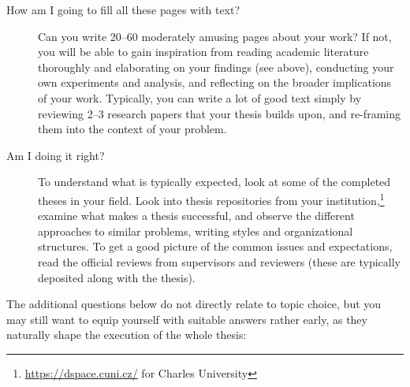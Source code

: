 \begin{description}
\item[How am I going to fill all these pages with text?]
Can you write 20--60 moderately amusing pages about your work? If not, you will be able to gain inspiration from reading academic literature thoroughly and elaborating on your findings (see above), conducting your own experiments and analysis, and reflecting on the broader implications of your work. Typically, you can write a lot of good text simply by reviewing 2--3 research papers that your thesis builds upon, and re-framing them into the context of your problem.
\item[Am I doing it right?]
To understand what is typically expected, look at some of the completed theses in your field. Look into thesis repositories from your institution,\footnote{\url{https://dspace.cuni.cz/} for Charles University} examine what makes a thesis successful, and observe the different approaches to similar problems, writing styles and organizational structures. To get a good picture of the common issues and expectations, read the official reviews from supervisors and reviewers (these are typically deposited along with the thesis).
\end{description}

The additional questions below do not directly relate to topic choice, but you may still want to equip yourself with suitable answers rather early, as they naturally shape the execution of the whole thesis:


